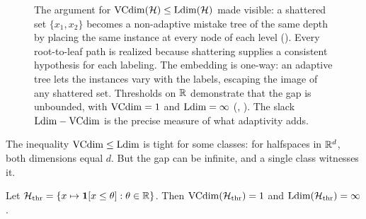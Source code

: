 \begin{figure}[ht]
\caption[Shattered set embeds as a non-adaptive tree, proving $\VC\le\Ldim$; thresholds on $\R$ show the gap is infinite]{The argument for $\mathrm{VCdim}(\mathcal{H})\le\mathrm{Ldim}(\mathcal{H})$ made visible: a shattered set $\{x_1,x_2\}$ becomes a non-adaptive mistake tree of the same depth by placing the same instance at every node of each level (). Every root-to-leaf path is realized because shattering supplies a consistent hypothesis for each labeling. The embedding is one-way: an adaptive tree lets the instances vary with the labels, escaping the image of any shattered set. Thresholds on $\R$ demonstrate that the gap is unbounded, with $\mathrm{VCdim}=1$ and $\mathrm{Ldim}=\infty$ (, ). The slack $\mathrm{Ldim} - \mathrm{VCdim}$ is the precise measure of what adaptivity adds.}
\label{fig:vc-leq-ldim}
\end{figure}

The inequality $\mathrm{VCdim} \leq \mathrm{Ldim}$ is tight for some classes: for halfspaces in $\mathbb{R}^d$, both dimensions equal $d$. But the gap can be infinite, and a single class witnesses it.

\begin{prop}
\label{prop:pac-online-sep}
Let $\mathcal{H}_{\mathrm{thr}} = \{x \mapsto \mathbf{1}[x \leq \theta] : \theta \in \mathbb{R}\}$. Then $\mathrm{VCdim}(\mathcal{H}_{\mathrm{thr}}) = 1$ and $\mathrm{Ldim}(\mathcal{H}_{\mathrm{thr}}) = \infty$.
\end{prop}

